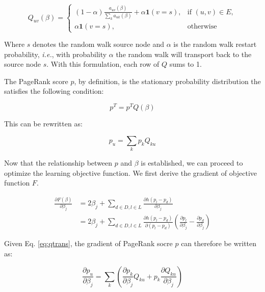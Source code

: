\documentclass[10pt]{article}
\begin{document}
\begin{multicols}{2}
\begin{equation} \label{eq:qeq}
Q_{uv}(\beta) =
\begin{cases}
	(1-\alpha)\frac{a_{uv}(\beta)}{\sum\limits_{k}a_{uk}(\beta)} + \alpha \textbf{1}(v = s), & \text{if } (u, v) \in E, \\
	\alpha \textbf{1}(v = s), & \text{otherwise}
\end{cases}
\end{equation}

Where $s$ denotes the random walk source node and $\alpha$ is the random walk restart probability, \textit{i.e.}, with probability $\alpha$ the random walk will transport back to the source node $s$. With this formulation, each row of $Q$ sums to 1.

The PageRank score $p$, by definition, is the stationary probability distribution the satisfies the following condition:

\begin{equation} \label{eq:piter}
p^{T} = p^{T} Q(\beta)
\end{equation}

This can be rewritten as:

\begin{equation} \label{eq:qtrans}
p_{u} = \sum\limits_{k}p_{k}Q_{ku}
\end{equation}

Now that the relationship between $p$ and $\beta$ is established, we can proceed to optimize the learning objective function. We first derive the gradient of objective function $F$.

\begin{align}
\frac{\partial F(\beta)}{\partial \beta_{j}} &= 2\beta_{j} + \sum\limits_{d \in D, l \in L}\frac{\partial h(p_{l} - p_{d})}{\partial \beta_{j}} \nonumber \\
&= 2\beta_{j} + \sum\limits_{d \in D, l \in L}\frac{\partial h(p_{l} - p_{d})}{\partial (p_{l} - p_{d})}(\frac{\partial p_{l}}{\partial \beta_{j}} - \frac{\partial p_{d}}{\partial \beta_{j}})
\end{align}

Given Eq. \ref{eq:qtrans}, the gradient of PageRank socre $p$ can therefore be written as:

\begin{equation} \label{eq:pdiff}
\frac{\partial p_{u}}{\partial \beta_{j}} = \sum\limits_{k}\left(\frac{\partial p_{k}}{\partial \beta_{j}}Q_{ku} + p_{k}\frac{\partial Q_{ku}}{\partial \beta_{j}}\right)
\end{equation}


\end{multicols}
\end{document}
